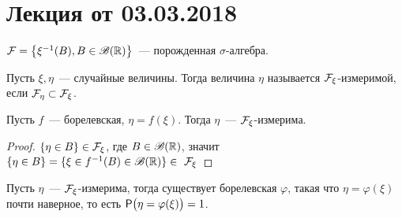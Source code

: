 \section{Лекция от 03.03.2018}
\setcounter{property}{0}
\begin{definition}
	$\F = \big\{ \xi^{-1}(B), B \in \B(\R) \big\}$~--- порожденная $\sigma$-алгебра.
\end{definition}
\begin{definition}
	Пусть $\xi, \eta$~--- случайные величины. Тогда величина $\eta$ называется $\F_\xi$-измеримой, если $\F_\eta \subset \F_\xi$.
\end{definition}
\begin{example}
	Пусть $f$~--- борелевская, $\eta = f(\xi)$. Тогда $\eta$~--- $\F_\xi$-измерима.
	\begin{proof}
		$\{\eta \in B\} \in \F_\xi$, где $B \in \B(\R)$, значит $\{\eta \in B\} = \{\xi \in f^{-1}(B) \in \B(\R)\} \in~\F_\xi$
	\end{proof}
\end{example}
\begin{theorem}[][Пока б/д]
	Пусть  $\eta$~--- $\F_\xi$-измерима, тогда существует борелевская $\varphi$, такая что $\eta = \varphi(\xi)$ почти наверное, то есть $\P\big(\eta = \varphi(\xi)\big) = 1$.
\end{theorem}
